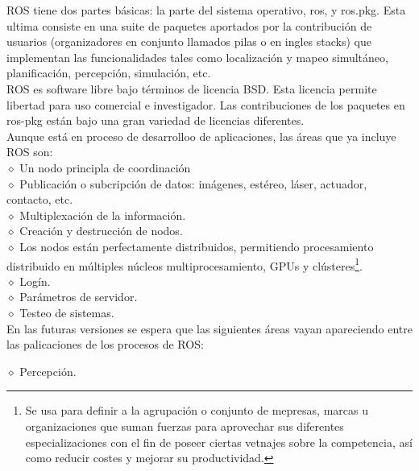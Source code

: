 \documentclass[letter,openrigth,12pt,spanish]{report}
\begin{document}
ROS tiene dos partes b\'asicas: la parte del sistema operativo, ros, y ros.pkg. Esta ultima consiste en una suite de paquetes aportados por la contribuci\'on de usuarios (organizadores en conjunto llamados pilas o en ingles stacks) que implementan las funcionalidades tales como localizaci\'on y mapeo simult\'aneo, planificaci\'on, percepci\'on, simulaci\'on, etc.\\

ROS es software libre bajo t\'erminos de licencia BSD. Esta licencia permite libertad para uso comercial e investigador. Las contribuciones de los paquetes en ros-pkg est\'an bajo una gran variedad de licencias diferentes.\\

Aunque est\'a en proceso de desarrolloo de aplicaciones, las \'areas que ya incluye ROS son:\\

$\diamond$ Un nodo principla de coordinaci\'on\\

$\diamond$ Publicaci\'on o subcripci\'on de datos: im\'agenes, est\'ereo, l\'aser, actuador, contacto, etc.\\

$\diamond$ Multiplexaci\'on de la informaci\'on.\\

$\diamond$ Creaci\'on y destrucci\'on de nodos.\\

$\diamond$ Los nodos est\'an perfectamente distribuidos, permitiendo procesamiento distribuido en m\'ultiples n\'ucleos multiprocesamiento, GPUs y cl\'usteres\footnote{Se usa para definir a la agrupaci\'on o conjunto de mepresas, marcas u organizaciones que suman fuerzas para aprovechar sus diferentes especializaciones con el fin de poseer ciertas vetnajes sobre la competencia, as\'i como reducir costes y mejorar su productividad.}.\\

$\diamond$ Log\'in.\\

$\diamond$ Par\'ametros de servidor.\\

$\diamond$ Testeo de sistemas.\\

En las futuras versiones se espera que las siguientes \'areas vayan apareciendo entre las palicaciones de los procesos de ROS:

$\diamond$ Percepci\'on.\\
\end{document}
